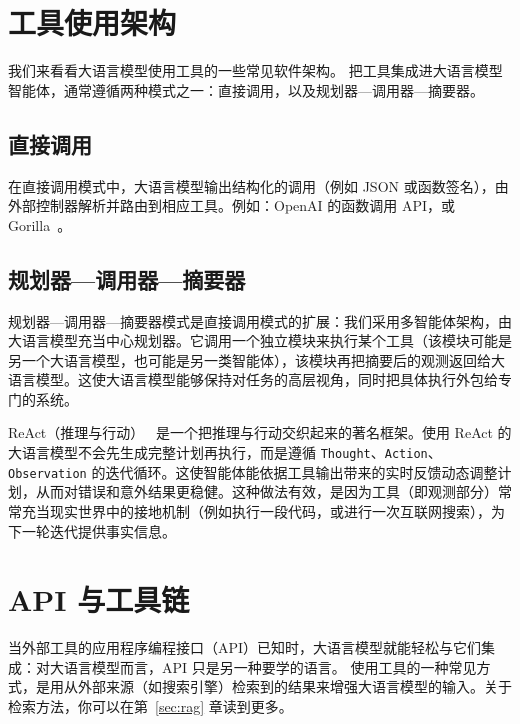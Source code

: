 \section{工具使用架构}
我们来看看大语言模型使用工具的一些常见软件架构。
把工具集成进大语言模型智能体，通常遵循两种模式之一：直接调用，以及规划器—调用器—摘要器。

\subsection*{直接调用}
在直接调用模式中，大语言模型输出结构化的调用（例如 JSON 或函数签名），由外部控制器解析并路由到相应工具。例如：OpenAI 的函数调用 API，或 Gorilla~\citep{patil2023gorillalargelanguagemodel}。

\subsection*{规划器—调用器—摘要器}
规划器—调用器—摘要器模式是直接调用模式的扩展：我们采用多智能体架构，由大语言模型充当中心规划器。它调用一个独立模块来执行某个工具（该模块可能是另一个大语言模型，也可能是另一类智能体），该模块再把摘要后的观测返回给大语言模型。这使大语言模型能够保持对任务的高层视角，同时把具体执行外包给专门的系统。

ReAct（推理与行动）~\citep{yao2022react} 是一个把推理与行动交织起来的著名框架。使用 ReAct 的大语言模型不会先生成完整计划再执行，而是遵循 \texttt{Thought}、\texttt{Action}、\texttt{Observation} 的迭代循环。这使智能体能依据工具输出带来的实时反馈动态调整计划，从而对错误和意外结果更稳健。这种做法有效，是因为工具（即观测部分）常常充当现实世界中的接地机制（例如执行一段代码，或进行一次互联网搜索），为下一轮迭代提供事实信息。


\section{API 与工具链}


当外部工具的应用程序编程接口（API）已知时，大语言模型就能轻松与它们集成：对大语言模型而言，API 只是另一种要学的语言。
使用工具的一种常见方式，是用从外部来源（如搜索引擎）检索到的结果来增强大语言模型的输入。关于检索方法，你可以在第~\ref{sec:rag} 章读到更多。

